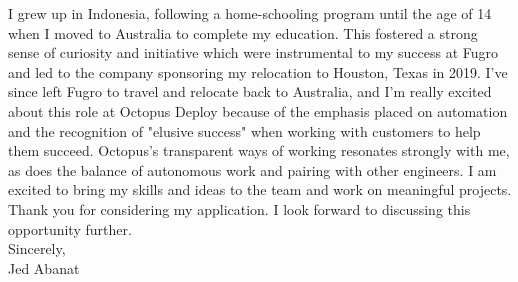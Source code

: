 I grew up in Indonesia, following a home-schooling program until the age of 14 when I moved to Australia to complete my education. This fostered a strong sense of curiosity and initiative which were instrumental to my success at Fugro and led to the company sponsoring my relocation to Houston, Texas in 2019. I've since left Fugro to travel and relocate back to Australia, and I'm really excited about this role at Octopus Deploy because of the emphasis placed on automation and the recognition of "elusive success" when working with customers to help them succeed. Octopus’s transparent ways of working resonates strongly with me, as does the balance of autonomous work and pairing with other engineers. I am excited to bring my skills and ideas to the team and work on meaningful projects. \\

Thank you for considering my application. I look forward to discussing this opportunity further. \\

Sincerely,\\
Jed Abanat